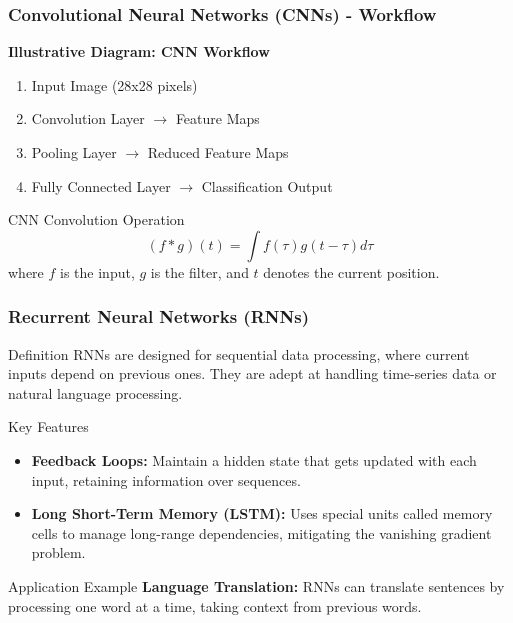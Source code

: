 \documentclass[aspectratio=169]{beamer}
\begin{document}
\begin{frame}[fragile]
    \frametitle{Convolutional Neural Networks (CNNs) - Workflow}
    \textbf{Illustrative Diagram: CNN Workflow}
    \begin{enumerate}
        \item Input Image (28x28 pixels)
        \item Convolution Layer $\rightarrow$ Feature Maps
        \item Pooling Layer $\rightarrow$ Reduced Feature Maps
        \item Fully Connected Layer $\rightarrow$ Classification Output
    \end{enumerate}

    \begin{block}{CNN Convolution Operation}
        \begin{equation}
        (f * g)(t) = \int f(\tau) g(t - \tau) d\tau
        \end{equation}
        where \( f \) is the input, \( g \) is the filter, and \( t \) denotes the current position.
    \end{block}
\end{frame}

\begin{frame}[fragile]
    \frametitle{Recurrent Neural Networks (RNNs)}
    \begin{block}{Definition}
        RNNs are designed for sequential data processing, where current inputs depend on previous ones. They are adept at handling time-series data or natural language processing.
    \end{block}
    
    \begin{block}{Key Features}
        \begin{itemize}
            \item \textbf{Feedback Loops:} Maintain a hidden state that gets updated with each input, retaining information over sequences.
            \item \textbf{Long Short-Term Memory (LSTM):} Uses special units called memory cells to manage long-range dependencies, mitigating the vanishing gradient problem.
        \end{itemize}
    \end{block}
    
    \begin{block}{Application Example}
        \textbf{Language Translation:} RNNs can translate sentences by processing one word at a time, taking context from previous words.
    \end{block}
\end{frame}
\end{document}
